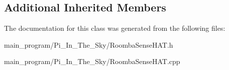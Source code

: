 \subsection*{Additional Inherited Members}


The documentation for this class was generated from the following files\+:\begin{DoxyCompactItemize}
\item 
main\+\_\+program/\+Pi\+\_\+\+In\+\_\+\+The\+\_\+\+Sky/Roomba\+Sense\+H\+A\+T.\+h\item 
main\+\_\+program/\+Pi\+\_\+\+In\+\_\+\+The\+\_\+\+Sky/Roomba\+Sense\+H\+A\+T.\+cpp\end{DoxyCompactItemize}
